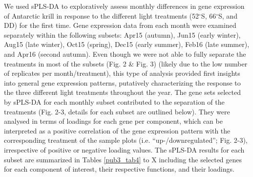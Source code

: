 We used sPLS-DA to exploratively assess monthly differences in gene expression
of Antarctic krill in response to the different light treatments (52$^{\circ}$S, 66$^{\circ}$S,
and DD) for the first time. Gene expression data from each month were examined
separately within the following subsets: Apr15 (autumn), Jun15 (early winter),
Aug15 (late winter), Oct15 (spring), Dec15 (early summer), Feb16 (late summer),
and Apr16 (second autumn). Even though we were not able to fully separate the
treatments in most of the subsets (Fig. 2 \& Fig. 3) (likely due to the low
number of replicates per month/treatment), this type of analysis provided first
insights into general gene expression patterns, putatively characterizing the
response to the three different light treatments throughout the year. The gene
sets selected by sPLS-DA for each monthly subset contributed to the separation
of the treatments (Fig. 2-3, details for each subset are outlined below). They
were analysed in terms of loadings for each gene per component, which can be
interpreted as a positive correlation of the gene expression pattern with the
corresponding treatment of the sample plots (i.e. “up-/downregulated”; Fig.
2-3), irrespective of positive or negative loading values. The sPLS-DA results
for each subset are summarized in Tables \ref{pub3_tab4} to X including the selected genes
for each component of interest, their respective functions, and their loadings.

